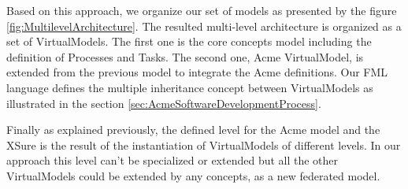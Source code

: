 Based on this approach, we organize our set of models as presented by the figure \ref{fig:MultilevelArchitecture}. The resulted multi-level architecture is organized as a set of VirtualModels. The first one is the core concepts model including the definition of Processes and Tasks. The second one, Acme VirtualModel, is extended from the previous model to integrate the Acme definitions. Our FML language defines the multiple inheritance concept between VirtualModels as illustrated in the section \ref{sec:AcmeSoftwareDevelopmentProcess}.

Finally as explained previously, the defined level for the Acme model and the XSure is the result of the instantiation of VirtualModels of different levels. In our approach this level can't be specialized or extended but all the other VirtualModels could be extended  by any concepts, as a new federated model. 





~\\
~\\



